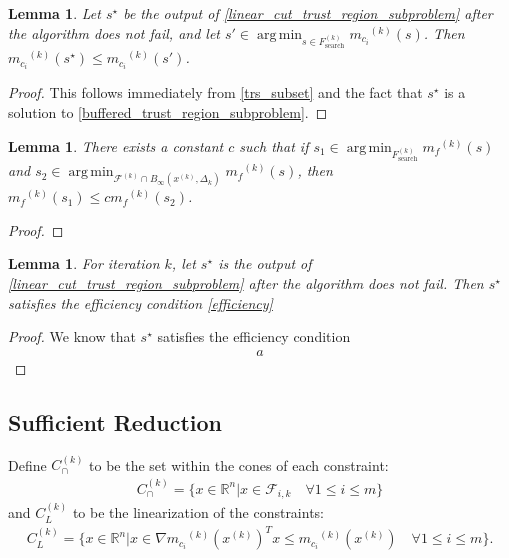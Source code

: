 \documentclass{article}
\newtheorem{lemma}[theorem]{Lemma}
\theoremstyle{case}
\newcommand{\xk}{{x^{(k)}}}
\newcommand{\Rn}{\mathbb R^n}
\newcommand{\dk}{\Delta_k}
\newcommand{\mfk}{{{m}_f}^{(k)}}
\newcommand{\mcik}{{{m}_{c_i}}^{(k)}}
\newcommand{\feasiblek}{{\mathcal F^{(k)}}}
\DeclareMathOperator*{\argmin}{arg\,min}
\newcommand{\fik}{{\mathcal F_{i, k}}}
\newcommand{\trsfesset}{{F^{(k)}_\text{search}}}
\newcommand{\capcones}{{C^{(k)}_{\cap}}}
\newcommand{\linearization}{{C^{(k)}_{L}}}
\newcommand{\tr}{{ B_{\infty}\left(\xk, \dk\right) }}
\begin{document}
\begin{lemma}
Let $s^{\star}$ be the output of \cref{linear_cut_trust_region_subproblem} after the algorithm does not fail, and let $s'  \in \argmin_{s \in \trsfesset} \mcik(s)$.
Then $\mcik(s^{\star}) \le \mcik(s')$.
\end{lemma}
\begin{proof}
This follows immediately from \cref{trs_subset} and the fact that $s^{\star}$ is a solution to \cref{buffered_trust_region_subproblem}.
\end{proof}

\begin{lemma}
There exists a constant $c$ such that if $s_1 \in \argmin_{\trsfesset}\mfk(s)$ and $s_2 \in \argmin_{\feasiblek \cap \tr} \mfk(s)$, then $\mfk(s_1) \le c \mfk(s_2)$.
\end{lemma}

\begin{proof}

\end{proof}

\begin{lemma}
For iteration $k$, let $s^{\star}$ is the output of \cref{linear_cut_trust_region_subproblem} after the algorithm does not fail.
Then $s^{\star}$ satisfies the efficiency condition \cref{efficiency}
\end{lemma}

\begin{proof}
We know that $s^{\star}$ satisfies the efficiency condition
\begin{align*}
a
\end{align*}
\end{proof}
\color{black}

\subsection{Sufficient Reduction}
\label{sufficient_reduction_section}

Define $\capcones$ to be the set within the cones of each constraint:
\begin{align}
\label{definecapcones}
\capcones = \{x\in\Rn | x \in \fik \quad \forall 1 \le i \le m \} 
\end{align}
and $\linearization$ to be the linearization of the constraints:
\begin{align}
\linearization = \{x \in\Rn | x \in \nabla \mcik(\xk)^Tx \le \mcik(\xk) \quad \forall 1\le i\le m\}.
\end{align}
\end{document}
